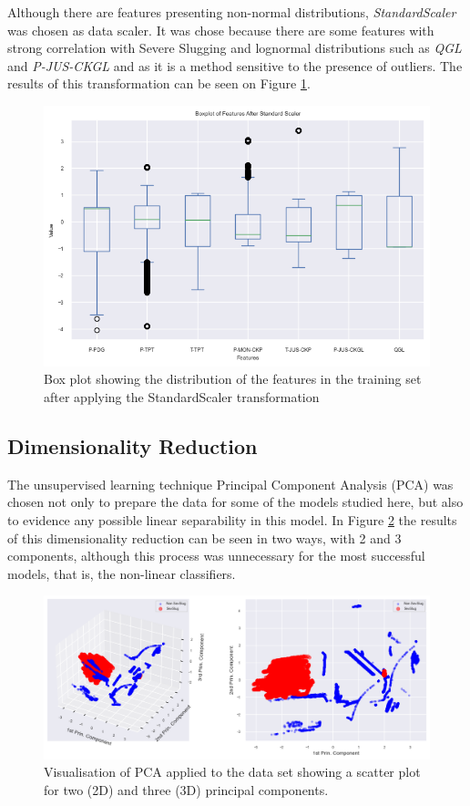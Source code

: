 \documentclass{article}
\begin{document}
Although there are features presenting non-normal distributions, \emph{StandardScaler} was chosen as data scaler. It was chose because there are some features with strong correlation with Severe Slugging and lognormal distributions such as \emph{QGL} and \emph{P-JUS-CKGL} and as it is a method sensitive to the presence of outliers. The results of this transformation can be seen on Figure \ref{fig:std_scaler}.

\begin{figure}
\centering
\includegraphics[width=1\textwidth]{std_scaler.png}
\caption{\label{fig:std_scaler}Box plot showing the distribution of the features in the training set after applying the StandardScaler transformation}
\end{figure}


\subsection{Dimensionality Reduction}

The unsupervised learning technique Principal Component Analysis (PCA) was chosen not only to prepare the data for some of the models studied here, but also to evidence any possible linear separability in this model. In Figure \ref{fig:pca} the results of this dimensionality reduction can be seen in two ways, with 2 and 3 components, although this process was unnecessary for the most successful models, that is, the non-linear classifiers.

\begin{figure}
\centering
\includegraphics[width=1\textwidth]{pca.png}
\caption{\label{fig:pca}Visualisation of PCA applied to the data set showing a scatter plot for two (2D) and three (3D) principal components.}
\end{figure}
\end{document}
